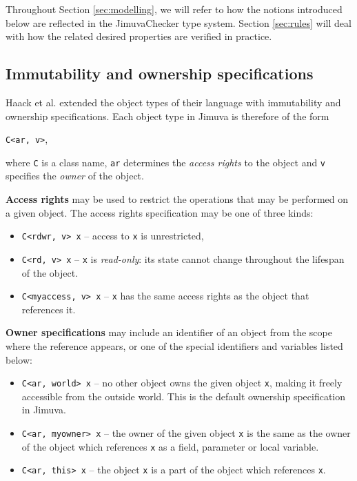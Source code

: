 \documentclass{pracamgr}
\theoremstyle{break}
\theoremstyle{break}
\theoremstyle{break}
\begin{document}
Throughout Section \ref{sec:modelling}, we will refer to how the
notions introduced below are reflected in the JimuvaChecker type
system. Section \ref{sec:rules} will deal with how the related
desired properties are verified in practice.

\subsection{Immutability and ownership specifications}
\label{subsec:imm-spec}

Haack et al. extended the object types of their language with
immutability and ownership specifications. Each object type in Jimuva
is therefore of the form
\begin{center}
  \texttt{C<ar, v>},
\end{center}
where \texttt{C} is a class name, \texttt{ar} determines the
\emph{access rights} to the object and \texttt{v} specifies the
\emph{owner} of the object.

\textbf{Access rights} may be used to restrict the operations that
may be performed on a given object. The access rights specification
may be one of three kinds:
\begin{itemize}
\item \texttt{C<rdwr, v> x} -- access to \texttt{x} is unrestricted, 
\item \texttt{C<rd, v> x} -- \texttt{x} is \emph{read-only}: its state
  cannot change throughout the lifespan of the object.
\item \texttt{C<myaccess, v> x} -- \texttt{x} has the same access
  rights as the object that references it.
\end{itemize}

\textbf{Owner specifications} may include an identifier of an object from the
scope where the reference appears, or one of the special identifiers
and variables listed below:
\begin{itemize}
\item \texttt{C<ar, world> x} -- no other object owns the given object
  \texttt{x}, making it freely accessible from the outside world. This
  is the default ownership specification in Jimuva.
\item \texttt{C<ar, myowner> x} -- the owner of the given object
  \texttt{x} is the same as the owner of the object which references
  \texttt{x} as a field, parameter or local variable.
\item \texttt{C<ar, this> x} -- the object \texttt{x} is a part of the 
  object which references \texttt{x}. 
\end{itemize}
\end{document}
